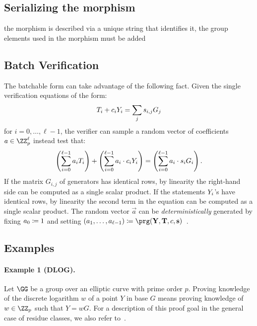 \documentclass[runningheads,11pt]{article}
\begin{document}
\subsection{Serializing the morphism}

the morphism is described via a unique string that identifies it, the group elements used in the morphism must be added
\subsection{Batch Verification}

The batchable form can take advantage of the following fact.
Given the single verification equations of the form:
\[
   T_i + c_i Y_i = \sum_j s_{i, j} G_j
\]
for $i=0, \dots,\ell-1$,
the verifier can sample a random vector of coefficients $a \in \ZZ_p^\ell$ instead test that:
\[
  \left(\sum_{i=0}^{\ell-1} a_i T_i\right) + \left(\sum_{i=0}^{\ell-1} a_i \cdot  c_i Y_i \right) = \left(\sum_{i=0}^{\ell-1} a_i \cdot s_i G_i\right).
\]
If the matrix $G_{i, j}$ of generators has identical rows, by linearity the right-hand side can be computed as a single scalar product.
If the statements $Y_i$'s have identical rows, by linearity the second term in the equation can be computed as a single scalar product.
The random vector $\vec a$ can be \emph{deterministically} generated by fixing $a_0 \coloneqq 1$ and setting $(a_1, \dots, a_{\ell-1}) \defeq \prg(\vec Y, \vec T,  \challenge, \vec s)$~\cite{bip-schnorr}.



\subsection{Examples}
\paragraph{Example 1 (DLOG).}
Let $\GG$ be a group over an elliptic curve with prime order $p$.
Proving knowledge of the discrete logarithm $w$ of a point $Y$ in base $G$ means proving knowledge of $w\in\ZZ_p$ such that $Y=wG$.
For a description of this proof goal in the general case of residue classes, we also refer to~\cite[1.4.1]{zkproof-reference}.
\end{document}
